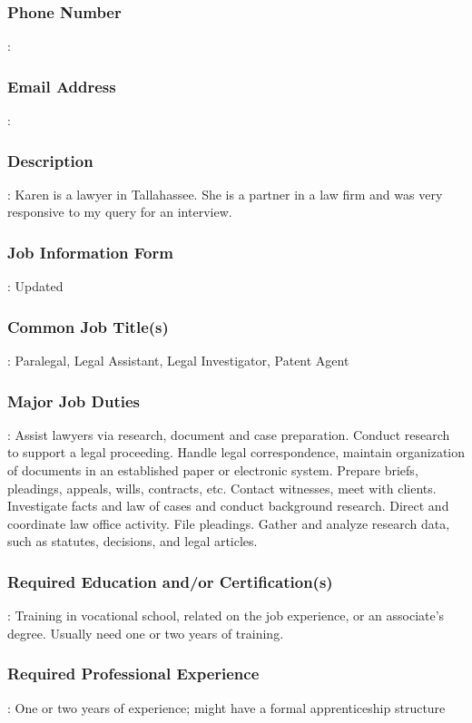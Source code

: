 \subsubsection*{Phone Number}:

\subsubsection*{Email Address}:

\subsubsection*{Description}: Karen is a lawyer in Tallahassee. She is a partner in a law firm and was very responsive to my query for an interview.

\subsubsection*{Job Information Form}: Updated

\subsubsection*{Common Job Title(s)}: Paralegal, Legal Assistant, Legal Investigator, Patent Agent

\subsubsection*{Major Job Duties}: Assist lawyers via research, document and case preparation. Conduct research to support a legal proceeding. Handle legal correspondence, maintain organization of documents in an established paper or electronic system. Prepare briefs, pleadings, appeals, wills, contracts, etc. Contact witnesses, meet with clients. Investigate facts and law of cases and conduct background research. Direct and coordinate law office activity. File pleadings. Gather and analyze research data, such as statutes, decisions, and legal articles.

\subsubsection*{Required Education and/or Certification(s)}: Training in vocational school, related on the job experience, or an associate's degree. Usually need one or two years of training.

\subsubsection*{Required Professional Experience}: One or two years of experience; might have a formal apprenticeship structure


